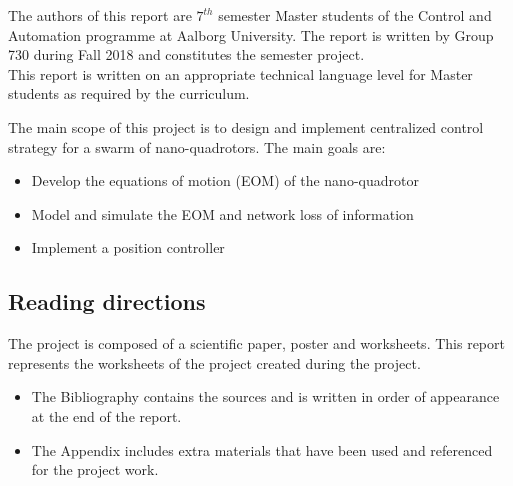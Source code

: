 \label{preface}
The authors of this report are $7^{th}$ semester Master students of the Control and Automation programme at Aalborg University. The report is written by Group 730 during Fall 2018 and constitutes the semester project.\\
This report is written on an appropriate technical language level for Master students as required by the curriculum.

\vspace{5mm}

\noindent The main scope of this project is to design and implement centralized control strategy for a swarm of nano-quadrotors. The main goals are:

\begin{itemize}
    \item Develop the equations of motion (EOM) of the nano-quadrotor
    \item Model and simulate the EOM and network loss of information
    \item Implement a position controller
\end{itemize}

\subsection*{Reading directions}

The project is composed of a scientific paper, poster and worksheets. This report represents the worksheets of the project created during the project.

\begin{itemize}
\item The Bibliography contains the sources and is written in order of appearance at the end of the report.
\item The Appendix includes extra materials that have been used and referenced for the project work.
\end{itemize}
